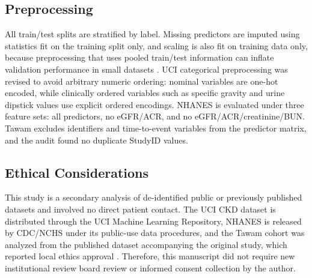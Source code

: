 \documentclass[12pt]{article}
\begin{document}
\subsection{Preprocessing}
All train/test splits are stratified by label. Missing predictors are imputed using statistics fit on the training split only, and scaling is also fit on training data only, because preprocessing that uses pooled train/test information can inflate validation performance in small datasets \cite{vabalas2019}. UCI categorical preprocessing was revised to avoid arbitrary numeric ordering: nominal variables are one-hot encoded, while clinically ordered variables such as specific gravity and urine dipstick values use explicit ordered encodings. NHANES is evaluated under three feature sets: all predictors, no eGFR/ACR, and no eGFR/ACR/creatinine/BUN. Tawam excludes identifiers and time-to-event variables from the predictor matrix, and the audit found no duplicate StudyID values.

\subsection{Ethical Considerations}
This study is a secondary analysis of de-identified public or previously published datasets and involved no direct patient contact. The UCI CKD dataset is distributed through the UCI Machine Learning Repository, NHANES is released by CDC/NCHS under its public-use data procedures, and the Tawam cohort was analyzed from the published dataset accompanying the original study, which reported local ethics approval \cite{rubini2015,cdc2024,alshamsi2018}. Therefore, this manuscript did not require new institutional review board review or informed consent collection by the author.
\end{document}
